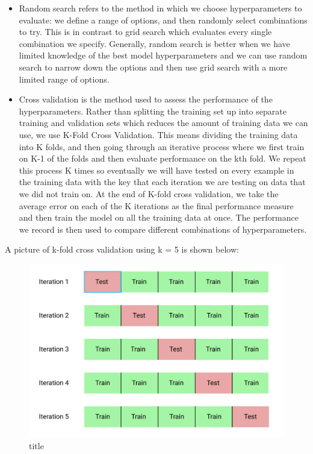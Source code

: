 \documentclass[11pt]{article}
\makeatletter
\def\maxwidth{\ifdim\Gin@nat@width>\linewidth\linewidth
    \else\Gin@nat@width\fi}
\let\Oldincludegraphics\includegraphics
\renewcommand{\includegraphics}[1]{\Oldincludegraphics[width=.8\maxwidth]{#1}}
\makeatother
\begin{document}
\begin{itemize}
\item
  Random search refers to the method in which we choose hyperparameters
  to evaluate: we define a range of options, and then randomly select
  combinations to try. This is in contrast to grid search which
  evaluates every single combination we specify. Generally, random
  search is better when we have limited knowledge of the best model
  hyperparameters and we can use random search to narrow down the
  options and then use grid search with a more limited range of options.
\item
  Cross validation is the method used to assess the performance of the
  hyperparameters. Rather than splitting the training set up into
  separate training and validation sets which reduces the amount of
  training data we can use, we use K-Fold Cross Validation. This means
  dividing the training data into K folds, and then going through an
  iterative process where we first train on K-1 of the folds and then
  evaluate performance on the kth fold. We repeat this process K times
  so eventually we will have tested on every example in the training
  data with the key that each iteration we are testing on data that we
  did not train on. At the end of K-fold cross validation, we take the
  average error on each of the K iterations as the final performance
  measure and then train the model on all the training data at once. The
  performance we record is then used to compare different combinations
  of hyperparameters.
\end{itemize}

    A picture of k-fold cross validation using k = 5 is shown below:

    \begin{figure}
\centering
\includegraphics{img/kfold_cv.png}
\caption{title}
\end{figure}
\end{document}
